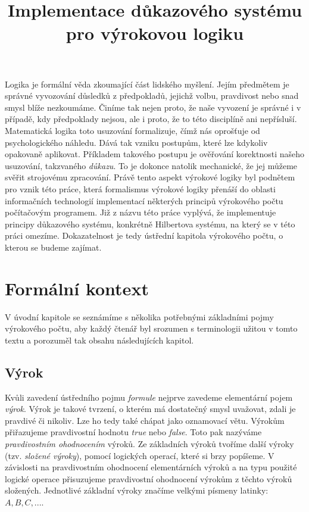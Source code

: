 \documentclass[thesis=B,czech]{FITthesis}[2012/06/26]
\title{Implementace důkazového systému pro výrokovou logiku}
\begin{document}

\begin{introduction}
Logika je formální věda zkoumající část lidského myšlení. Jejím předmětem je správné vyvozování důsledků z předpokladů, jejichž volbu, pravdivost nebo snad smysl blíže nezkoumáme. Činíme tak nejen proto, že naše vyvození je správné i v případě, kdy předpoklady nejsou, ale i proto, že to této disciplíně ani nepřísluší. Matematická logika toto usuzování formalizuje, čímž nás oprošťuje od psychologického náhledu. Dává tak vzniku postupům, které lze kdykoliv opakovaně aplikovat. Příkladem takového postupu je ověřování korektnosti našeho usuzování, takzvaného \emph{důkazu}. To je dokonce natolik mechanické, že jej můžeme svěřit strojovému zpracování\cite{sochor}. Právě tento aspekt výrokové logiky byl podnětem pro vznik této práce, která formalismus výrokové logiky přenáší do oblasti informačních technologií implementací některých principů výrokového počtu počítačovým programem. Již z názvu této práce vyplývá, že implementuje principy důkazového systému, konkrétně Hilbertova systému, na který se v této práci omezíme. Dokazatelnost je tedy ústřední kapitola výrokového počtu, o kterou se budeme zajímat.
\end{introduction}

%
%
%

\chapter{Formální kontext}

V úvodní kapitole se seznámíme s několika potřebnými základními pojmy výrokového počtu, aby každý čtenář byl srozumen s terminologii užitou v tomto textu a porozuměl tak obsahu následujících kapitol.

\section{Výrok}
\label{sec:vyrok}

Kvůli zavedení ústředního pojmu \emph{formule} nejprve zavedeme elementární pojem \emph{výrok}.
Výrok je takové tvrzení, o kterém má dostatečný smysl uvažovat, zdali je pravdivé či nikoliv. Lze ho tedy také chápat jako oznamovací větu. Výrokům přiřazujeme pravdivostní hodnotu \emph{true} nebo \emph{false}. Toto pak nazýváme \emph{pravdivostním ohodnocením} výroků. Ze základních výroků tvoříme další výroky (tzv. \emph{složené výroky}), pomocí logických operací, které si brzy popíšeme. V závislosti na pravdivostním ohodnocení elementárních výroků a na typu použité logické operace přisuzujeme pravdivostní ohodnocení výrokům z těchto výroků složených. Jednotlivé základní výroky značíme velkými písmeny latinky: $A, B, C, ...$.
\end{document}
